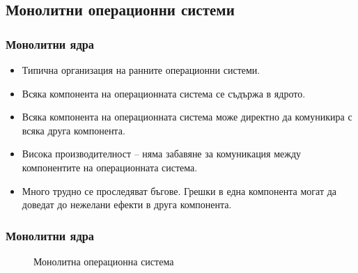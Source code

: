\documentclass[ignorenonframetext, hyperref=unicode]{beamer}
\begin{document}
\subsection{Монолитни операционни системи}

\begin{frame}
\frametitle{Монолитни ядра}
\begin{itemize}
\item Типична организация на ранните операционни системи.
\item Всяка компонента на операционната система се съдържа в ядрото.
\item Всяка компонента на операционната система може директно да комуникира с
всяка друга компонента.
\item Висока производителност -- няма забавяне за комуникация между компонентите
на операционната система.
\item Много трудно се проследяват бъгове. Грешки в една компонента могат да
доведат до нежелани ефекти в друга компонента.
\end{itemize}
\end{frame}

\begin{frame}
\frametitle{Монолитни ядра}
\begin{figure}[h]
\center
{}
\caption{Монолитна операционна система}
\end{figure}
\end{frame}
\end{document}
